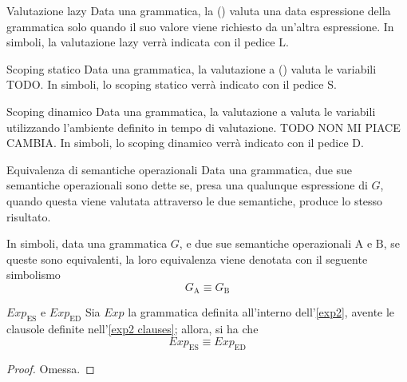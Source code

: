 \documentclass[a4paper, 12pt]{report}
\begin{document}
    \begin{frameddefn}{Valutazione lazy}
        Data una grammatica, la  () valuta una data espressione della grammatica solo quando il suo valore viene richiesto da un'altra espressione. In simboli, la valutazione lazy verrà indicata con il pedice $\mathrm{L}$.
    \end{frameddefn}

    \begin{frameddefn}{Scoping statico}
        Data una grammatica, la valutazione a  () valuta le variabili TODO. In simboli, lo scoping statico verrà indicato con il pedice $\mathrm{S}$.
    \end{frameddefn}

    \begin{frameddefn}{Scoping dinamico}
        Data una grammatica, la valutazione a  valuta le variabili utilizzando l'ambiente definito in tempo di valutazione. TODO NON MI PIACE CAMBIA. In simboli, lo scoping dinamico verrà indicato con il pedice $\mathrm{D}$.
    \end{frameddefn}

    \begin{frameddefn}[label={equiv lang}]{Equivalenza di semantiche operazionali}
        Data una grammatica, due sue semantiche operazionali sono dette  se, presa una qualunque espressione di $G$, quando questa viene valutata attraverso le due semantiche, produce lo stesso risultato.

        In simboli, data una grammatica $G$, e due sue semantiche operazionali $\mathrm{A}$ e $\mathrm{B}$, se queste sono equivalenti, la loro equivalenza viene denotata con il seguente simbolismo $$G_\mathrm{A} \equiv G_\mathrm{B}$$
    \end{frameddefn}

    \begin{framedlem}{$Exp_\mathrm{ES}$ e $Exp_\mathrm{ED}$}
        Sia $Exp$ la grammatica definita all'interno dell'\cref{exp2}, avente le clausole definite nell'\cref{exp2 clauses}; allora, si ha che $$Exp_\mathrm{ES} \equiv Exp_\mathrm{ED}$$
    \end{framedlem}

    \begin{proof}
        Omessa.
    \end{proof}
\end{document}
